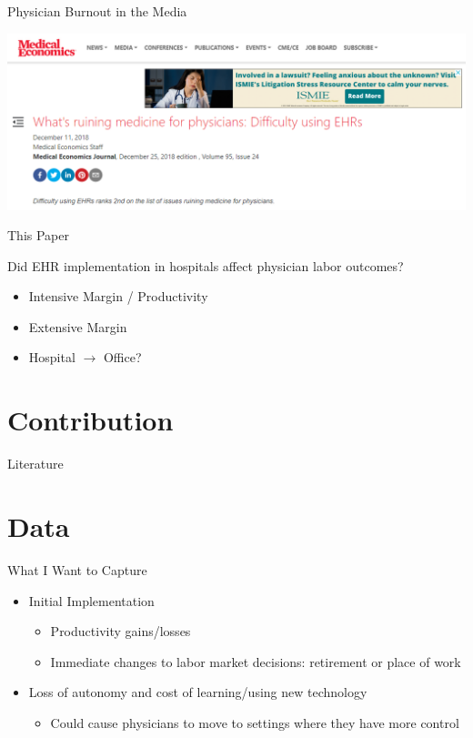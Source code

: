 \documentclass[10pt]{beamer}
\begin{document}
\begin{frame}[noframenumbering]{Physician Burnout in the Media}
\begin{center}
    \includegraphics[scale=.45]{graphics/News Clip3.PNG}
\end{center}
\end{frame}

\begin{frame}{This Paper}

Did EHR implementation in hospitals affect physician labor outcomes?
\begin{itemize}
    \item Intensive Margin / Productivity
    \item Extensive Margin
    \item Hospital $\rightarrow$ Office?
\end{itemize}
\end{frame}


\section{Contribution}

\begin{frame}{Literature}
    
\end{frame}





\section{Data}


\begin{frame}{What I Want to Capture}
\begin{itemize}
    \item Initial Implementation
    \begin{itemize}
        \item Productivity gains/losses
        \item Immediate changes to labor market decisions: retirement or place of work
    \end{itemize}
    \item Loss of autonomy and cost of learning/using new technology
    \begin{itemize}
        \item Could cause physicians to move to settings where they have more control
    \end{itemize}
\end{itemize}


\end{frame}
\end{document}
